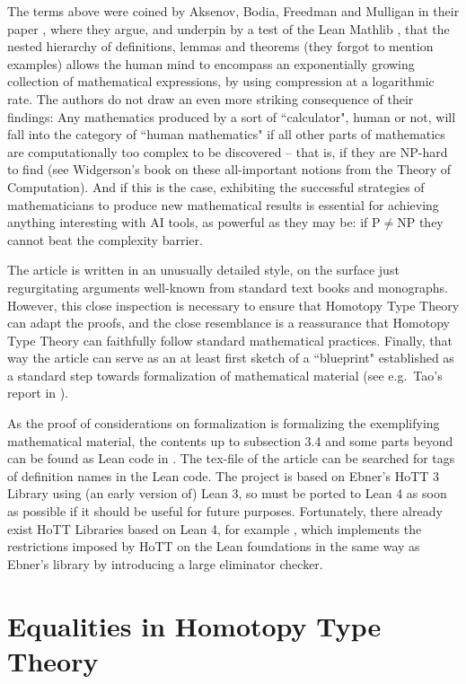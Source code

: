 \documentclass{amsart}
\theoremstyle{plain}
\numberwithin{equation}{section} %
\numberwithin{figure}{section} %
\theoremstyle{plain}
\theoremstyle{plain}
\theoremstyle{plain}
\theoremstyle{plain}
\theoremstyle{plain}
\theoremstyle{plain}
\theoremstyle{remark}
\theoremstyle{remark}
\theoremstyle{remark}
\begin{document}
The terms above were coined by Aksenov, Bodia, Freedman and Mulligan in their paper \cite{ABFM26}, where they argue, and underpin by a test of the Lean Mathlib \cite{Mathlib}, that the nested hierarchy of definitions, lemmas and theorems (they forgot to mention examples) allows the human mind to encompass an exponentially growing collection of mathematical expressions, by using compression at a logarithmic rate. The authors do not draw an even more striking consequence of their findings: Any mathematics produced by a sort of ``calculator", human or not, will fall into the category of ``human mathematics" if all other parts of mathematics are computationally too complex to be discovered -- that is, if they are NP-hard to find (see Widgerson's book \cite{Wid19} on these all-important notions from the Theory of Computation). And if this is the case, exhibiting the successful strategies of mathematicians to produce new mathematical results is essential for achieving anything interesting with AI tools, as powerful as they may be: if $\mathrm{P} \neq \mathrm{NP}$ they cannot beat the complexity barrier.    

The article is written in an unusually detailed style, on the surface just regurgitating arguments well-known from standard text books and monographs. However, this close inspection is necessary to ensure that Homotopy Type Theory can adapt the proofs, and the close resemblance is a reassurance that Homotopy Type Theory can faithfully follow standard mathematical practices. Finally, that way the article can serve as an at least first sketch of a ``blueprint" established as a standard step towards formalization of mathematical material (see e.g.\ Tao's report in \cite{TaoBlog23}).

As the proof of considerations on formalization is formalizing the exemplifying mathematical material, the contents up to subsection 3.4 and some parts beyond can be found as Lean code in \cite{Lean-HoTT}. The tex-file of the article can be searched for tags of definition names in the Lean code. The project is based on Ebner's HoTT 3 Library \cite{HoTT3} using (an early version of) Lean 3, so must be ported to Lean 4 as soon as possible if it should be useful for future purposes. Fortunately, there already exist HoTT Libraries based on Lean 4, for example \cite{HoTT4}, which implements the restrictions imposed by HoTT on the Lean foundations in the same way as Ebner's library by introducing a large eliminator checker. 


\section{Equalities in Homotopy Type Theory}   
\end{document}
